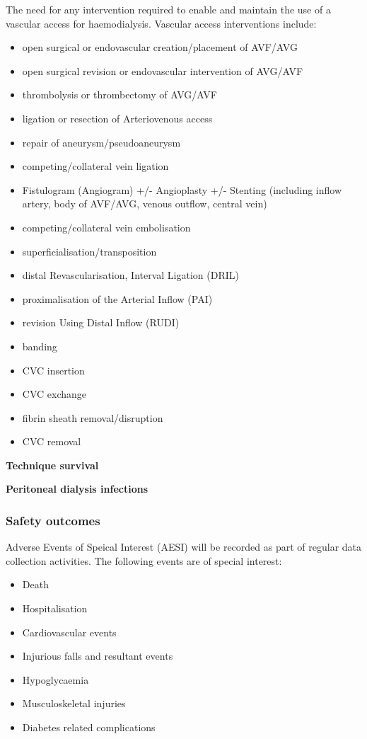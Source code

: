 \documentclass[11pt,parskip=half-]{scrartcl}
\providecommand{\tightlist}{%
  \setlength{\itemsep}{0pt}\setlength{\parskip}{0pt}}
\begin{document}
The need for any intervention required to enable and maintain the use of a vascular access for haemodialysis. Vascular access interventions include:
\begin{itemize}\tightlist
  \item open surgical or endovascular creation/placement of AVF/AVG
  \item open surgical revision or endovascular intervention of AVG/AVF
  \item thrombolysis or thrombectomy of AVG/AVF
  \item ligation or resection of Arteriovenous access
  \item repair of aneurysm/pseudoaneurysm
  \item competing/collateral vein ligation
  \item Fistulogram (Angiogram) +/- Angioplasty +/- Stenting (including inflow artery, body of AVF/AVG, venous outflow, central vein)
  \item competing/collateral vein embolisation
  \item superficialisation/transposition
  \item distal Revascularisation, Interval Ligation (DRIL)
  \item proximalisation of the Arterial Inflow (PAI)
  \item revision Using Distal Inflow (RUDI)
  \item banding
  \item CVC insertion
  \item CVC exchange
  \item fibrin sheath removal/disruption
  \item CVC removal
\end{itemize}

\textbf{Technique survival}

\textbf{Peritoneal dialysis infections}


\subsubsection{Safety outcomes}\label{safety-outcomes}

Adverse Events of Speical Interest (AESI) will be recorded as part of regular data collection activities. The following events are of special interest:
\begin{itemize}\tightlist
  \item Death
  \item Hospitalisation
  \item Cardiovascular events
  \item Injurious falls and resultant events
  \item Hypoglycaemia
  \item Musculoskeletal injuries
  \item Diabetes related complications
\end{itemize}
\end{document}
